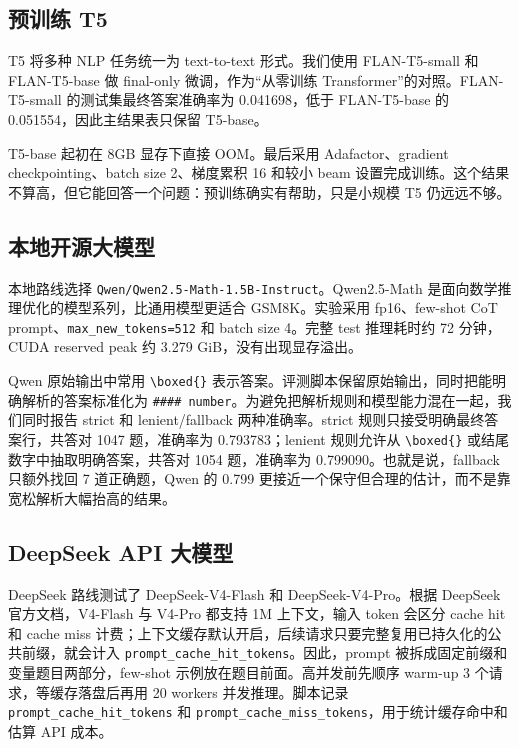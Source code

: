 \documentclass[UTF8,a4paper,zihao=-4]{ctexart}
\begin{document}
\subsection{预训练 T5}

T5 将多种 NLP 任务统一为 text-to-text 形式\cite{raffel2020t5}。我们使用 FLAN-T5-small 和 FLAN-T5-base 做 final-only 微调，作为“从零训练 Transformer”的对照。FLAN-T5-small 的测试集最终答案准确率为 0.041698，低于 FLAN-T5-base 的 0.051554，因此主结果表只保留 T5-base。

T5-base 起初在 8GB 显存下直接 OOM。最后采用 Adafactor、gradient checkpointing、batch size 2、梯度累积 16 和较小 beam 设置完成训练。这个结果不算高，但它能回答一个问题：预训练确实有帮助，只是小规模 T5 仍远远不够。

\subsection{本地开源大模型}

本地路线选择 \texttt{Qwen/Qwen2.5-Math-1.5B-Instruct}。Qwen2.5-Math 是面向数学推理优化的模型系列\cite{yang2024qwen25math}，比通用模型更适合 GSM8K。实验采用 fp16、few-shot CoT prompt、\texttt{max\_new\_tokens=512} 和 batch size 4。完整 test 推理耗时约 72 分钟，CUDA reserved peak 约 3.279 GiB，没有出现显存溢出。

Qwen 原始输出中常用 \verb|\boxed{}| 表示答案。评测脚本保留原始输出，同时把能明确解析的答案标准化为 \texttt{\#\#\#\# number}。为避免把解析规则和模型能力混在一起，我们同时报告 strict 和 lenient/fallback 两种准确率。strict 规则只接受明确最终答案行，共答对 1047 题，准确率为 0.793783；lenient 规则允许从 \verb|\boxed{}| 或结尾数字中抽取明确答案，共答对 1054 题，准确率为 0.799090。也就是说，fallback 只额外找回 7 道正确题，Qwen 的 0.799 更接近一个保守但合理的估计，而不是靠宽松解析大幅抬高的结果。

\subsection{DeepSeek API 大模型}

DeepSeek 路线测试了 DeepSeek-V4-Flash 和 DeepSeek-V4-Pro。根据 DeepSeek 官方文档，V4-Flash 与 V4-Pro 都支持 1M 上下文，输入 token 会区分 cache hit 和 cache miss 计费\cite{deepseekprice}；上下文缓存默认开启，后续请求只要完整复用已持久化的公共前缀，就会计入 \texttt{prompt\_cache\_hit\_tokens}\cite{deepseekcache}。因此，prompt 被拆成固定前缀和变量题目两部分，few-shot 示例放在题目前面。高并发前先顺序 warm-up 3 个请求，等缓存落盘后再用 20 workers 并发推理。脚本记录 \texttt{prompt\_cache\_hit\_tokens} 和 \texttt{prompt\_cache\_miss\_tokens}，用于统计缓存命中和估算 API 成本。
\end{document}
